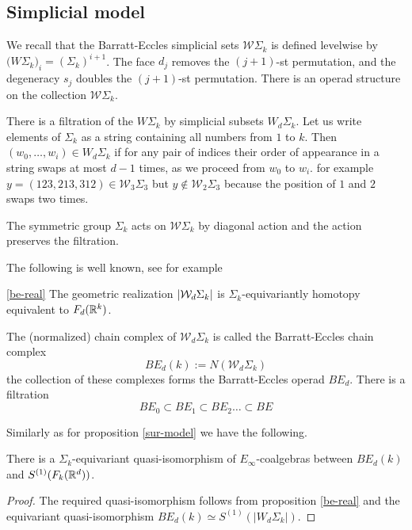 \subsection{Simplicial model} \label{ss:simplicial model}

We recall that the Barratt-Eccles simplicial sets $\mathcal{W}\Sigma_k$ is defined levelwise by $\mathcal({W}\Sigma_k)_i=(\Sigma_k)^{i+1}$.
The face $d_{j}$ removes the $(j+1)$-st permutation, and the degeneracy $s_j$ doubles the $(j+1)$-st permutation.
There is an operad structure on the collection $\mathcal{W} \Sigma_k$.

There is a filtration of the $W \Sigma_k$ by simplicial subsets
$W_d \Sigma_k$.
Let us write elements of $\Sigma_k$ as a string containing all numbers from $1$ to $k$.
Then $(w_0,\dots,w_i) \in W_d \Sigma_k$ if for any pair of indices their order of appearance in a string swaps at most $d-1$ times, as we proceed from $w_0$ to $w_i$.
for example $y=(123,213,312) \in \mathcal{W}_3 \Sigma_3$ but $y \notin \mathcal{W}_2 \Sigma_3$
because the position of $1$ and $2$ swaps two times.

The symmetric group $\Sigma_k$ acts on
$\mathcal{W} \Sigma_k$ by diagonal action and the action preserves the filtration.

The following is well known, see for example \cite{BF}
\begin{proposition} \ref{be-real}
	The geometric realization $\lvert\mathcal{W}_d \Sigma_k\rvert$ is $\Sigma_k$-equivariantly homotopy equivalent to $F_d(\mathbb{R}^k)$.
\end{proposition}

The (normalized) chain complex of $\mathcal{W}_d\Sigma_k$ is called the Barratt-Eccles chain complex $$BE_d(k):=N(\mathcal{W}_d\Sigma_k)$$
the collection of these complexes forms the Barratt-Eccles operad $BE_d$.
\cite{BF}
There is a filtration
$$BE_0 \subset BE_1 \subset BE_2 \dots \subset BE$$

Similarly as for proposition \ref{sur-model} we have the following.

\begin{proposition}
	There is a  $\Sigma_k$-equivariant quasi-isomorphism
	of $E_\infty$-coalgebras between $BE_d(k)$ and
	$S^{(1)}(F_k(\mathbb{R}^d))$.
\end{proposition}

\begin{proof} \label{be-model}
	The required quasi-isomorphism follows from proposition \ref{be-real} and the equivariant quasi-isomorphism $BE_d(k) \simeq S^{(1)}(|W_d\Sigma_k|)$. %
\end{proof}

